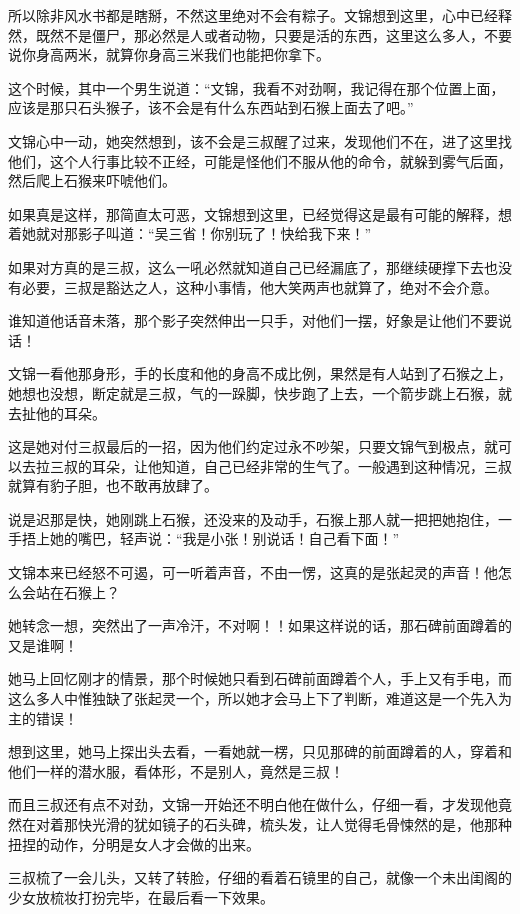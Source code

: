 所以除非风水书都是瞎掰，不然这里绝对不会有粽子。文锦想到这里，心中已经释然，既然不是僵尸，那必然是人或者动物，只要是活的东西，这里这么多人，不要说你身高两米，就算你身高三米我们也能把你拿下。

这个时候，其中一个男生说道：“文锦，我看不对劲啊，我记得在那个位置上面，应该是那只石头猴子，该不会是有什么东西站到石猴上面去了吧。”

文锦心中一动，她突然想到，该不会是三叔醒了过来，发现他们不在，进了这里找他们，这个人行事比较不正经，可能是怪他们不服从他的命令，就躲到雾气后面，然后爬上石猴来吓唬他们。

如果真是这样，那简直太可恶，文锦想到这里，已经觉得这是最有可能的解释，想着她就对那影子叫道：“吴三省！你别玩了！快给我下来！”

如果对方真的是三叔，这么一吼必然就知道自己已经漏底了，那继续硬撑下去也没有必要，三叔是豁达之人，这种小事情，他大笑两声也就算了，绝对不会介意。

谁知道他话音未落，那个影子突然伸出一只手，对他们一摆，好象是让他们不要说话！

文锦一看他那身形，手的长度和他的身高不成比例，果然是有人站到了石猴之上，她想也没想，断定就是三叔，气的一跺脚，快步跑了上去，一个箭步跳上石猴，就去扯他的耳朵。

这是她对付三叔最后的一招，因为他们约定过永不吵架，只要文锦气到极点，就可以去拉三叔的耳朵，让他知道，自己已经非常的生气了。一般遇到这种情况，三叔就算有豹子胆，也不敢再放肆了。

说是迟那是快，她刚跳上石猴，还没来的及动手，石猴上那人就一把把她抱住，一手捂上她的嘴巴，轻声说：“我是小张！别说话！自己看下面！”

文锦本来已经怒不可遏，可一听着声音，不由一愣，这真的是张起灵的声音！他怎么会站在石猴上？

她转念一想，突然出了一声冷汗，不对啊！！如果这样说的话，那石碑前面蹲着的又是谁啊！

她马上回忆刚才的情景，那个时候她只看到石碑前面蹲着个人，手上又有手电，而这么多人中惟独缺了张起灵一个，所以她才会马上下了判断，难道这是一个先入为主的错误！

想到这里，她马上探出头去看，一看她就一楞，只见那碑的前面蹲着的人，穿着和他们一样的潜水服，看体形，不是别人，竟然是三叔！

而且三叔还有点不对劲，文锦一开始还不明白他在做什么，仔细一看，才发现他竟然在对着那快光滑的犹如镜子的石头碑，梳头发，让人觉得毛骨悚然的是，他那种扭捏的动作，分明是女人才会做的出来。

三叔梳了一会儿头，又转了转脸，仔细的看着石镜里的自己，就像一个未出闺阁的少女放梳妆打扮完毕，在最后看一下效果。

